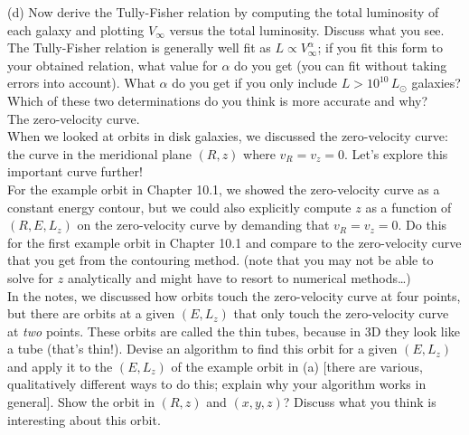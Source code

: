 \documentclass[12pt]{article}
\begin{document}
(d) Now derive the Tully-Fisher relation by computing the total
luminosity of each galaxy and plotting $V_\infty$ versus the total
luminosity. Discuss what you see. The Tully-Fisher relation is
generally well fit as $L \propto V_\infty^\alpha$; if you fit this form
to your obtained relation, what value for $\alpha$ do you get (you can
fit without taking errors into account). What $\alpha$ do you get if
you only include $L > 10^{10}\,L_\odot$ galaxies? Which of these two
determinations do you think is more accurate and why?\\

 The zero-velocity curve.\\

When we looked at orbits in disk galaxies, we discussed the
zero-velocity curve: the curve in the meridional plane $(R,z)$ where
$v_R = v_z = 0$. Let's explore this important curve further!\\

 For the example orbit in Chapter 10.1, we showed
the zero-velocity curve as a constant energy contour, but we could
also explicitly compute $z$ as a function of $(R,E,L_z)$ on the
zero-velocity curve by demanding that $v_R = v_z = 0$. Do this for the
first example orbit in Chapter 10.1 and compare to the zero-velocity
curve that you get from the contouring method. (note that you may not
be able to solve for $z$ analytically and might have to resort to
numerical methods\ldots)\\

 In the notes, we discussed how orbits touch the
zero-velocity curve at four points, but there are orbits at a given
$(E,L_z)$ that only touch the zero-velocity curve at \emph{two}
points. These orbits are called the thin tubes, because in 3D they
look like a tube (that's thin!). Devise an algorithm to find this
orbit for a given $(E,L_z)$ and apply it to the $(E,L_z)$ of the
example orbit in (a) [there are various, qualitatively different ways
  to do this; explain why your algorithm works in general]. Show the
orbit in $(R,z)$ and $(x,y,z)$? Discuss what you think is interesting
about this orbit.
\end{document}
